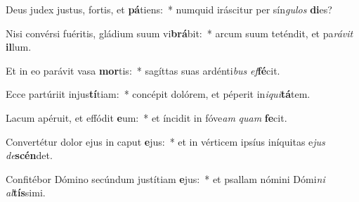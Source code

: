 \item Deus judex justus, fortis, et \textbf{pá}tiens:~* numquid iráscitur per sín\textit{gu}\textit{los} \textbf{di}es?
\item Nisi convérsi fuéritis, gládium suum vi\textbf{brá}bit:~* arcum suum teténdit, et pa\textit{rá}\textit{vit} \textbf{il}lum.
\item Et in eo parávit vasa \textbf{mor}tis:~* sagíttas suas ardénti\textit{bus} \textit{ef}\textbf{fé}cit.
\item Ecce partúriit injus\textbf{tí}tiam:~* concépit dolórem, et péperit in\textit{i}\textit{qui}\textbf{tá}tem.
\item Lacum apéruit, et effódit \textbf{e}um:~* et íncidit in fóve\textit{am} \textit{quam} \textbf{fe}cit.
\item Convertétur dolor ejus in caput \textbf{e}jus:~* et in vérticem ipsíus iníquitas e\textit{jus} \textit{de}\textbf{scén}det.
\item Confitébor Dómino secúndum justítiam \textbf{e}jus:~* et psallam nómini Dómi\textit{ni} \textit{al}\textbf{tís}simi.
